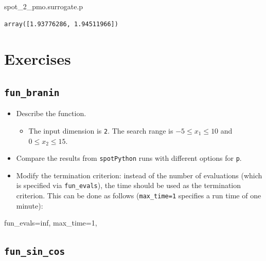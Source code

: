\documentclass[
  letterpaper,
  DIV=11,
  numbers=noendperiod]{scrreprt}
\newenvironment{Shaded}{\begin{snugshade}}{\end{snugshade}}
\newcommand{\DecValTok}[1]{\textcolor[rgb]{0.68,0.00,0.00}{#1}}
\newcommand{\NormalTok}[1]{\textcolor[rgb]{0.00,0.23,0.31}{#1}}
\newcommand{\OperatorTok}[1]{\textcolor[rgb]{0.37,0.37,0.37}{#1}}
\providecommand{\tightlist}{%
  \setlength{\itemsep}{0pt}\setlength{\parskip}{0pt}}\usepackage{longtable,booktabs,array}
\begin{document}
\begin{Shaded}
\begin{Highlighting}[]
\NormalTok{spot\_2\_pmo.surrogate.p}
\end{Highlighting}
\end{Shaded}

\begin{verbatim}
array([1.93776286, 1.94511966])
\end{verbatim}

\section{Exercises}\label{exercises-8}

\subsection{\texorpdfstring{\texttt{fun\_branin}}{fun\_branin}}\label{fun_branin}

\begin{itemize}
\tightlist
\item
  Describe the function.

  \begin{itemize}
  \tightlist
  \item
    The input dimension is \texttt{2}. The search range is
    \(-5 \leq x_1 \leq 10\) and \(0 \leq x_2 \leq 15\).
  \end{itemize}
\item
  Compare the results from \texttt{spotPython} runs with different
  options for \texttt{p}.
\item
  Modify the termination criterion: instead of the number of evaluations
  (which is specified via \texttt{fun\_evals}), the time should be used
  as the termination criterion. This can be done as follows
  (\texttt{max\_time=1} specifies a run time of one minute):
\end{itemize}

\begin{Shaded}
\begin{Highlighting}[]
\NormalTok{fun\_evals}\OperatorTok{=}\NormalTok{inf,}
\NormalTok{max\_time}\OperatorTok{=}\DecValTok{1}\NormalTok{,}
\end{Highlighting}
\end{Shaded}

\subsection{\texorpdfstring{\texttt{fun\_sin\_cos}}{fun\_sin\_cos}}\label{fun_sin_cos}
\end{document}
